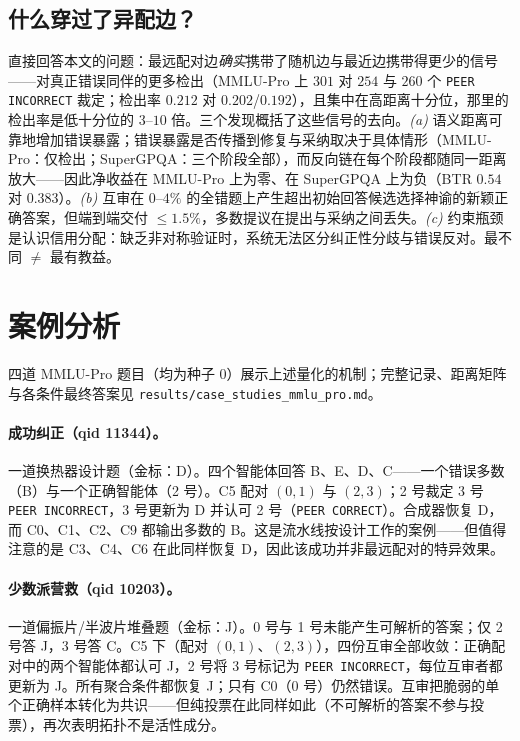 \documentclass[UTF8,11pt]{ctexart}
\begin{document}
\subsection{什么穿过了异配边？}
\label{sec:what}

直接回答本文的问题：最远配对边\emph{确实}携带了随机边与最近边携带得更少的信号——对真正错误同伴的更多检出（MMLU-Pro 上 $301$ 对 $254$ 与 $260$ 个 \texttt{PEER INCORRECT} 裁定；检出率 $0.212$ 对 $0.202$/$0.192$），且集中在高距离十分位，那里的检出率是低十分位的 $3$--$10$ 倍。三个发现概括了这些信号的去向。\emph{(a)} 语义距离可靠地增加错误暴露；错误暴露是否传播到修复与采纳取决于具体情形（MMLU-Pro：仅检出；SuperGPQA：三个阶段全部），而反向链在每个阶段都随同一距离放大——因此净收益在 MMLU-Pro 上为零、在 SuperGPQA 上为负（BTR $0.54$ 对 $0.383$）。\emph{(b)} 互审在 $0$--$4\%$ 的全错题上产生超出初始回答候选选择神谕的新颖正确答案，但端到端交付 $\le 1.5\%$，多数提议在提出与采纳之间丢失。\emph{(c)} 约束瓶颈是认识信用分配：缺乏非对称验证时，系统无法区分纠正性分歧与错误反对。最不同 $\neq$ 最有教益。

\section{案例分析}
\label{sec:cases}

四道 MMLU-Pro 题目（均为种子 0）展示上述量化的机制；完整记录、距离矩阵与各条件最终答案见 \texttt{results/case\_studies\_mmlu\_pro.md}。

\paragraph{成功纠正（qid 11344）。}
一道换热器设计题（金标：D）。四个智能体回答 B、E、D、C——一个错误多数（B）与一个正确智能体（2 号）。C5 配对 $(0,1)$ 与 $(2,3)$；2 号裁定 3 号 \texttt{PEER INCORRECT}，3 号更新为 D 并认可 2 号（\texttt{PEER CORRECT}）。合成器恢复 D，而 C0、C1、C2、C9 都输出多数的 B。这是流水线按设计工作的案例——但值得注意的是 C3、C4、C6 在此同样恢复 D，因此该成功并非最远配对的特异效果。

\paragraph{少数派营救（qid 10203）。}
一道偏振片/半波片堆叠题（金标：J）。0 号与 1 号未能产生可解析的答案；仅 2 号答 J，3 号答 C。C5 下（配对 $(0,1)$、$(2,3)$），四份互审全部收敛：正确配对中的两个智能体都认可 J，2 号将 3 号标记为 \texttt{PEER INCORRECT}，每位互审者都更新为 J。所有聚合条件都恢复 J；只有 C0（0 号）仍然错误。互审把脆弱的单个正确样本转化为共识——但纯投票在此同样如此（不可解析的答案不参与投票），再次表明拓扑不是活性成分。
\end{document}
